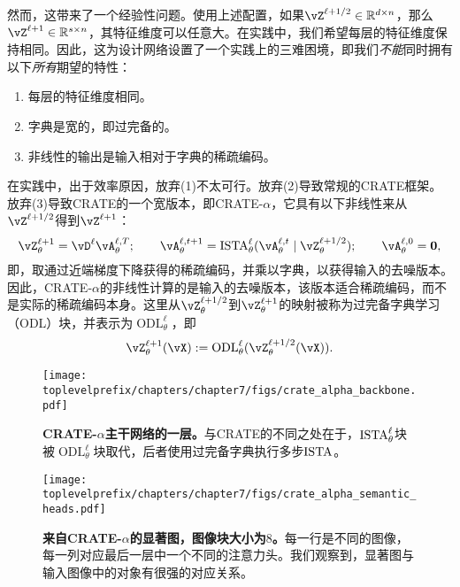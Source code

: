 \documentclass[../../book-main.tex]{subfiles}
\begin{document}
然而，这带来了一个经验性问题。使用上述配置，如果\(\vZ^{\ell + 1/2} \in \R^{d \times n}\)，那么\(\vZ^{\ell + 1} \in \R^{s \times n}\)，其特征维度可以任意大。在实践中，我们希望每层的特征维度保持相同。因此，这为设计网络设置了一个实践上的三难困境，即我们\textit{不能}同时拥有以下\textit{所有}期望的特性：
\begin{enumerate}
    \item 每层的特征维度相同。
    \item 字典是宽的，即过完备的。
    \item 非线性的输出是输入相对于字典的稀疏编码。
\end{enumerate}
在实践中，出于效率原因，放弃(1)不太可行。放弃(2)导致常规的CRATE框架。放弃(3)导致CRATE的一个宽版本，即CRATE-\(\alpha\)，它具有以下非线性来从\(\vZ^{\ell + 1/2}\)得到\(\vZ^{\ell + 1}\)：
\begin{equation}
    \vZ_{\theta}^{\ell + 1} = \vD^{\ell}\vA_{\theta}^{\ell, T}; \qquad \vA_{\theta}^{\ell, t + 1} = \ISTA_{\theta}^{\ell}(\vA_{\theta}^{\ell, t} \mid \vZ_{\theta}^{\ell + 1/2}); \qquad \vA_{\theta}^{\ell, 0} = \vzero,
\end{equation}
即，取通过近端梯度下降获得的稀疏编码，并乘以字典，以获得输入的去噪版本。因此，CRATE-\(\alpha\)的非线性计算的是输入的去噪版本，该版本适合稀疏编码，而不是实际的稀疏编码本身。这里从\(\vZ_{\theta}^{\ell + 1/2}\)到\(\vZ_{\theta}^{\ell + 1}\)的映射被称为过完备字典学习（ODL）块，并表示为\(\operatorname{ODL}_{\theta}^{\ell}\)，即
\begin{equation}
    \vZ_{\theta}^{\ell + 1}(\vX) := \operatorname{ODL}_{\theta}^{\ell}(\vZ_{\theta}^{\ell + 1/2}(\vX)).
\end{equation}

\begin{figure}
    \centering 
    \texttt{[image: \\toplevelprefix/chapters/chapter7/figs/crate\_alpha\_backbone.pdf]}
    \caption{\small\textbf{CRATE-\(\alpha\)主干网络的一层。}与CRATE的不同之处在于，\(\operatorname{ISTA}_{\theta}^{\ell}\)块被\(\operatorname{ODL}_{\theta}^{\ell}\)块取代，后者使用过完备字典执行多步\(\operatorname{ISTA}\)。}
    \label{fig:crate_alpha_backbone}
\end{figure}

\begin{figure}
    \centering 
    \texttt{[image: \\toplevelprefix/chapters/chapter7/figs/crate\_alpha\_semantic\_heads.pdf]}
    \caption{\small\textbf{来自CRATE-\(\alpha\)的显著图，图像块大小为\(8\)。}每一行是不同的图像，每一列对应最后一层中一个不同的注意力头。我们观察到，显著图与输入图像中的对象有很强的对应关系。}
    \label{fig:crate_alpha_saliency_maps}
\end{figure}
\end{document}
